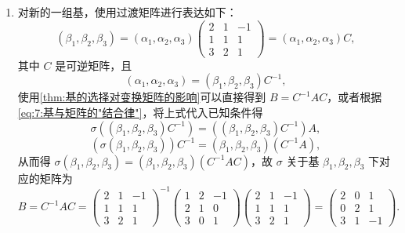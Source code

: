 \begin{solution}
    \begin{enumerate}
        \item 对新的一组基，使用过渡矩阵进行表达如下：
              \[(\beta_{1}, \beta_{2}, \beta_{3})=(\alpha_{1}, \alpha_{2}, \alpha_{3})\begin{pmatrix}
                      2 & 1 & -1 \\
                      1 & 1 & 1  \\
                      3 & 2 & 1
                  \end{pmatrix}=(\alpha_{1}, \alpha_{2}, \alpha_{3}) C,\]
              其中 $C$ 是可逆矩阵，且
              \[(\alpha_{1},\alpha_{2},\alpha_{3})=(\beta_{1},\beta_{2},\beta_{3}) C^{-1},\]
              使用\autoref{thm:基的选择对变换矩阵的影响}可以直接得到 $B=C^{-1} A C$，或者根据\autoref{eq:7:基与矩阵的"结合律"}，将上式代入已知条件得
              \[\sigma((\beta_{1}, \beta_{2}, \beta_{3}) C^{-1})=((\beta_{1}, \beta_{2}, \beta_{3}) C^{-1}) A,\]
              \[(\sigma(\beta_{1}, \beta_{2}, \beta_{3})) C^{-1}=(\beta_{1}, \beta_{2}, \beta_{3})(C^{-1} A),\]
              从而得 $\sigma(\beta_{1}, \beta_{2}, \beta_{3})=(\beta_{1}, \beta_{2}, \beta_{3})(C^{-1} A C)$，故 $\sigma$ 关于基 $\beta_{1}, \beta_{2}, \beta_{3}$ 下对应的矩阵为
              \[B=C^{-1} A C = \begin{pmatrix}
                      2 & 1 & -1 \\
                      1 & 1 & 1  \\
                      3 & 2 & 1
                  \end{pmatrix}^{-1}\begin{pmatrix}
                      1 & 2 & -1 \\
                      2 & 1 & 0  \\
                      3 & 0 & 1
                  \end{pmatrix}\begin{pmatrix}
                      2 & 1 & -1 \\
                      1 & 1 & 1  \\
                      3 & 2 & 1
                  \end{pmatrix}=\begin{pmatrix}
                      2 & 0 & 1  \\
                      0 & 2 & 1  \\
                      3 & 1 & -1
                  \end{pmatrix}.\]


\end{enumerate}
\end{solution}
